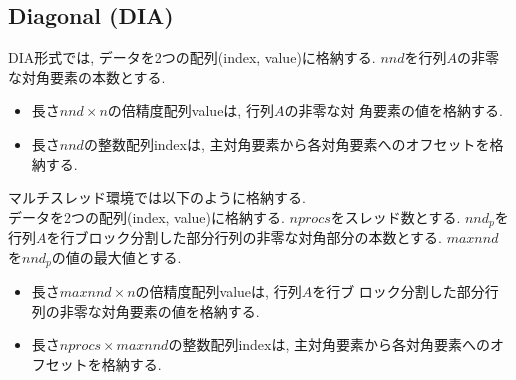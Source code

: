 \documentclass[a4paper]{jarticle}
\begin{document}
{{\newpage
\subsection{Diagonal (DIA)}
DIA形式では, データを2つの配列({\ttfamily index, value})に格納する. 
$nnd$を行列$A$の非零な対角要素の本数とする. 
\begin{itemize}
\item 長さ$nnd \times n$の倍精度配列{\ttfamily value}は, 行列$A$の非零な対
      角要素の値を格納する. 
\item 長さ$nnd$の整数配列{\ttfamily index}は, 主対角要素から各対角要素へのオフセットを格納する. 
\end{itemize}
マルチスレッド環境では以下のように格納する.\\
データを2つの配列({\ttfamily index, value})に格納する. $nprocs$をスレッド数とする. 
$nnd_p$を行列$A$を行ブロック分割した部分行列の非零な対角部分の本数とする. 
$maxnnd$を$nnd_p$の値の最大値とする. 
\begin{itemize}
\item 長さ$maxnnd \times n$の倍精度配列{\ttfamily value}は, 行列$A$を行ブ
      ロック分割した部分行列の非零な対角要素の値を格納する. 
\item 長さ$nprocs \times maxnnd$の整数配列{\ttfamily index}は, 主対角要素から各対角要素へのオフセットを格納する. 
\end{itemize}

}}
\end{document}
